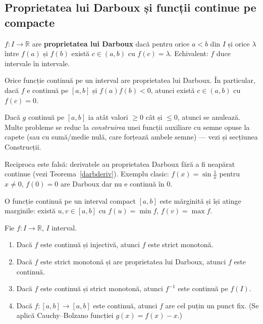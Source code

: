 \subsection{Proprietatea lui Darboux și funcții continue pe compacte}

\begin{definitie}
$f:I\to\mathbb{R}$ are \textbf{proprietatea lui Darboux} dacă pentru orice $a<b$ din $I$ și orice $\lambda$ între $f(a)$ și $f(b)$ există $c\in(a,b)$ cu $f(c)=\lambda$. Echivalent: $f$ duce intervale în intervale.
\end{definitie}

\begin{teorema}
Orice funcție continuă pe un interval are proprietatea lui Darboux. În particular, dacă $f$ e continuă pe $[a,b]$ și $f(a)f(b)<0$, atunci există $c\in(a,b)$ cu $f(c)=0$.
\end{teorema}

\begin{obs}
Dacă $g$ continuă pe $[a,b]$ ia atât valori $\ge0$ cât și $\le0$, atunci se anulează. Multe probleme se reduc la \emph{construirea} unei funcții auxiliare cu semne opuse la capete (sau cu sumă/medie nulă, care forțează ambele semne) --- vezi și secțiunea Construcții.
\end{obs}

\begin{obs}
Reciproca este falsă: derivatele au proprietatea Darboux fără a fi neapărat continue (vezi Teorema~\ref{darbderiv}). Exemplu clasic: $f(x)=\sin\frac1x$ pentru $x\ne 0$, $f(0)=0$ are Darboux dar nu e continuă în $0$.
\end{obs}

\begin{teorema}[Weierstrass]
O funcție continuă pe un interval compact $[a,b]$ este mărginită și își atinge marginile: există $u,v\in[a,b]$ cu $f(u)=\min f$, $f(v)=\max f$.
\end{teorema}

\begin{teorema}
Fie $f:I\to\mathbb{R}$, $I$ interval.
\begin{enumerate}[leftmargin=*, itemsep=1pt]
\item Dacă $f$ este continuă și injectivă, atunci $f$ este strict monotonă.
\item Dacă $f$ este strict monotonă și are proprietatea lui Darboux, atunci $f$ este continuă.
\item Dacă $f$ este continuă și strict monotonă, atunci $f^{-1}$ este continuă pe $f(I)$.
\item Dacă $f:[a,b]\to[a,b]$ este continuă, atunci $f$ are cel puțin un punct fix. (Se aplică Cauchy--Bolzano funcției $g(x)=f(x)-x$.)
\end{enumerate}
\end{teorema}

